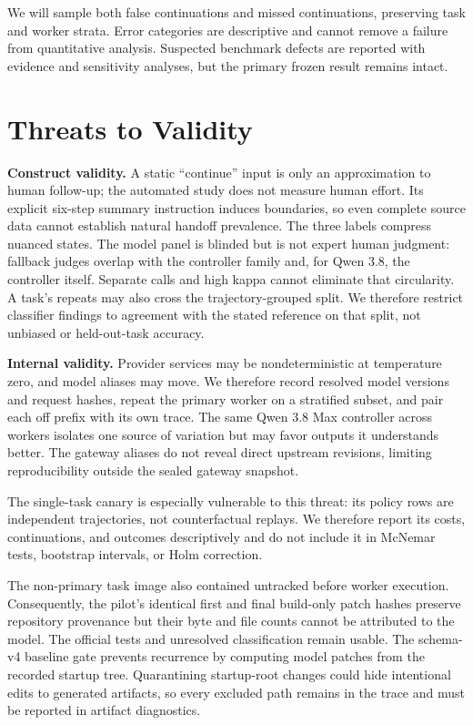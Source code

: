 \documentclass[sigconf,nonacm]{acmart}
\begin{document}
We will sample both false continuations and missed continuations, preserving task and worker strata. Error categories are descriptive and cannot remove a failure from quantitative analysis. Suspected benchmark defects are reported with evidence and sensitivity analyses, but the primary frozen result remains intact.

\section{Threats to Validity}\label{sec:threats}

\textbf{Construct validity.} A static ``continue'' input is only an approximation to human follow-up; the automated study does not measure human effort. Its explicit six-step summary instruction induces boundaries, so even complete source data cannot establish natural handoff prevalence. The three labels compress nuanced states. The model panel is blinded but is not expert human judgment: fallback judges overlap with the controller family and, for Qwen 3.8, the controller itself. Separate calls and high kappa cannot eliminate that circularity. A task's repeats may also cross the trajectory-grouped split. We therefore restrict classifier findings to agreement with the stated reference on that split, not unbiased or held-out-task accuracy.

\textbf{Internal validity.} Provider services may be nondeterministic at temperature zero, and model aliases may move. We therefore record resolved model versions and request hashes, repeat the primary worker on a stratified subset, and pair each off prefix with its own trace. The same Qwen 3.8 Max controller across workers isolates one source of variation but may favor outputs it understands better. The gateway aliases do not reveal direct upstream revisions, limiting reproducibility outside the sealed gateway snapshot.

The single-task canary is especially vulnerable to this threat: its policy rows are independent trajectories, not counterfactual replays. We therefore report its costs, continuations, and outcomes descriptively and do not include it in McNemar tests, bootstrap intervals, or Holm correction.

The non-primary task image also contained untracked  before worker execution. Consequently, the pilot's identical first and final build-only patch hashes preserve repository provenance but their byte and file counts cannot be attributed to the model. The official tests and unresolved classification remain usable. The schema-v4 baseline gate prevents recurrence by computing model patches from the recorded startup tree. Quarantining startup-root changes could hide intentional edits to generated artifacts, so every excluded path remains in the trace and must be reported in artifact diagnostics.
\end{document}
